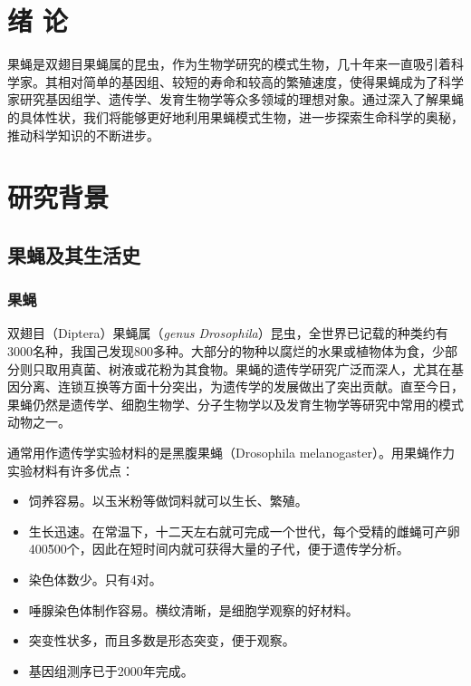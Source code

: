\documentclass[AutoFakeBold]{LZUThesis}
\begin{document}
\customcontent




\mainmatter

\chapter{\texorpdfstring{绪 \quad 论}{绪论}}
​果蝇是双翅目果蝇属的昆虫，作为生物学研究的模式生物，几十年来一直吸引着科学家。其相对简单的基因组、较短的寿命和较高的繁殖速度，使得果蝇成为了科学家研究基因组学、遗传学、发育生物学等众多领域的理想对象。通过深入了解果蝇的具体性状，我们将能够更好地利用果蝇模式生物，进一步探索生命科学的奥秘，推动科学知识的不断进步。
\chapter{研究背景}
\section{果蝇及其生活史}
\subsection{果蝇}
双翅目（Diptera）果蝇属（\textit{genus Drosophila}）昆虫，全世界已记载的种类约有3000名种，我国己发现800多种。大部分的物种以腐烂的水果或植物体为食，少部分则只取用真菌、树液或花粉为其食物。果蝇的遗传学研究广泛而深人，尤其在基因分离、连锁互换等方面十分突出，为遗传学的发展做出了突出贡献。直至今日，果蝇仍然是遗传学、细胞生物学、分子生物学以及发育生物学等研究中常用的模式动物之一。

通常用作遗传学实验材料的是黑腹果蝇（Drosophila melanogaster）。用果蝇作力实验材料有许多优点：
\begin{itemize}
    \item 饲养容易。以玉米粉等做饲料就可以生长、繁殖。
    \item 生长迅速。在常温下，十二天左右就可完成一个世代，每个受精的雌蝇可产卵400\~500个，因此在短时间内就可获得大量的子代，便于遗传学分析。
    \item 染色体数少。只有4对。
    \item 唾腺染色体制作容易。横纹清晰，是细胞学观察的好材料。
    \item 突变性状多，而且多数是形态突变，便于观察。
    \item 基因组测序已于2000年完成。
\end{itemize}
\end{document}
